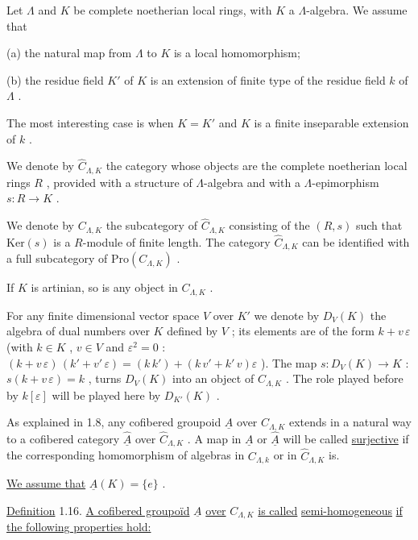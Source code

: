 Let $\Lambda$ and $K$ be complete noetherian local rings, with $K$ a $\Lambda$-algebra. We assume that

(a)  the natural map from $\Lambda$ to $K$ is a local homomorphism;

(b)  the residue field $K'$ of $K$ is an extension of finite type of the residue field $k$ of $\Lambda$ .

The most interesting case is when $K = K'$ and $K$ is a finite inseparable extension of $k$ .

We denote by $\hat{C}_{\Lambda,K}$ the category whose objects are the complete noetherian local rings $R$ , provided with a structure of $\Lambda$-algebra and with a $\Lambda$-epimorphism $s : R \longrightarrow K$ .

We denote by $C_{\Lambda,K}$ the subcategory of $\hat{C}_{\Lambda,K}$ consisting of the $(R, s)$ such that $\mathrm{Ker}(s)$ is a $R$-module of finite length. The category $\hat{C}_{\Lambda,K}$ can be identified with a full subcategory of $\mathrm{Pro}(C_{\Lambda,K})$ .

If $K$ is artinian, so is any object in $C_{\Lambda,K}$ .

For any finite dimensional vector space $V$ over $K'$ we denote by $D_V(K)$ the algebra of dual numbers over $K$ defined by $V$ ; its elements are of the form $k + v\,\varepsilon$ (with $k \in K$ , $v \in V$ and $\varepsilon^2 = 0$ : $(k + v\,\varepsilon)\,(k' + v'\,\varepsilon) = (k\,k') + (k\,v' + k'\,v)\varepsilon$  ). The map $s : D_V(K) \to K$ : $s(k + v\,\varepsilon) = k$ , turns $D_V(K)$ into an object of $C_{\Lambda,K}$ . The role played before by $k[\varepsilon]$ will be played here by $D_{K'}(K)$ .

As explained in 1.8, any cofibered groupoid $\underline{A}$ over $C_{\Lambda,K}$ extends in a natural way to a cofibered category $\hat{\underline{A}}$ over $\hat{C}_{\Lambda,K}$ . A map in $\underline{A}$ or $\hat{\underline{A}}$ will be called \underline{surjective} if the corresponding homomorphism of algebras in $C_{\Lambda,k}$ or in $\hat{C}_{\Lambda,K}$ is.


\underline{We assume that} $\underline{A}(K) = \{e\}$ .

\underline{Definition} 1.16.  \underline{A cofibered groupoïd} $\underline{A}$ \underline{over} $C_{\Lambda,K}$ \underline{is called} \underline{semi-homogeneous} \underline{if the following properties hold:}


